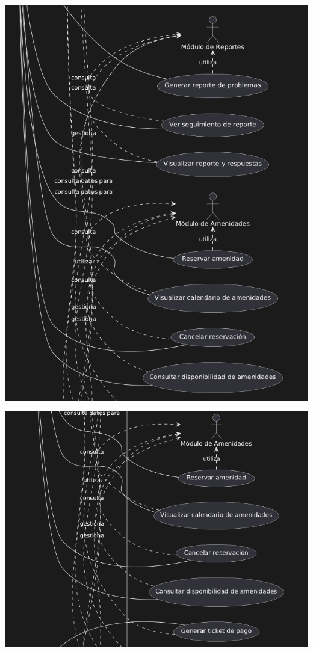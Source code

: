 \documentclass[protocolo.tex]{subfiles}
\begin{document}
\includegraphics[scale=0.8]{Imagenes/adminfracpt2.png}


\includegraphics[scale=0.8]{Imagenes/adminfracpt3.png}
\end{document}
